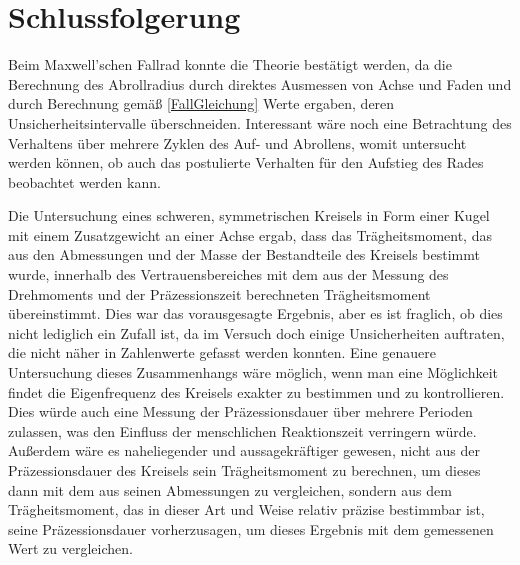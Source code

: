 \documentclass[
	a4paper,
	12pt,
	pagesize,
	ngerman
]{scrartcl}
\begin{document}
	\section{Schlussfolgerung}
	Beim Maxwell'schen Fallrad konnte die Theorie bestätigt werden, da die Berechnung des Abrollradius durch direktes Ausmessen von Achse und Faden und durch Berechnung gemäß \cref{FallGleichung} Werte ergaben, deren Unsicherheitsintervalle überschneiden.
	Interessant wäre noch eine Betrachtung des Verhaltens über mehrere Zyklen des Auf- und Abrollens, womit untersucht werden können, ob auch das postulierte Verhalten für den Aufstieg des Rades beobachtet werden kann. %
	\par
	Die Untersuchung eines schweren, symmetrischen Kreisels in Form einer Kugel mit einem Zusatzgewicht an einer Achse ergab, dass das Trägheitsmoment, das aus den Abmessungen und der Masse der Bestandteile des Kreisels bestimmt wurde, innerhalb des Vertrauensbereiches mit dem aus der Messung des Drehmoments und der Präzessionszeit berechneten Trägheitsmoment übereinstimmt.
	Dies war das vorausgesagte Ergebnis, aber es ist fraglich, ob dies nicht lediglich ein Zufall ist, da im Versuch doch einige Unsicherheiten auftraten, die nicht näher in Zahlenwerte gefasst werden konnten.
	Eine genauere Untersuchung dieses Zusammenhangs wäre möglich, wenn man eine Möglichkeit findet die Eigenfrequenz des Kreisels exakter zu bestimmen und zu kontrollieren.
	Dies würde auch eine Messung der Präzessionsdauer über mehrere Perioden zulassen, was den Einfluss der menschlichen Reaktionszeit verringern würde.
	Außerdem wäre es naheliegender und aussagekräftiger gewesen, nicht aus der Präzessionsdauer des Kreisels sein Trägheitsmoment zu berechnen, um dieses dann mit dem aus seinen Abmessungen zu vergleichen, sondern aus dem Trägheitsmoment, das in dieser Art und Weise relativ präzise bestimmbar ist, seine Präzessionsdauer vorherzusagen, um dieses Ergebnis mit dem gemessenen Wert zu vergleichen.
	
\end{document}
